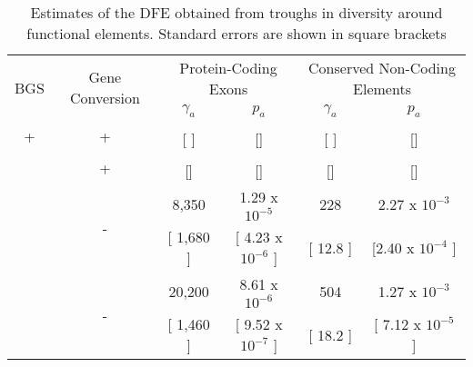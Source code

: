 

\begin{table}[h]
\caption{Estimates of the DFE obtained from troughs in diversity around functional elements. Standard errors are shown in square brackets}
\centering
	\label{EstimatesCastaneus}
        \begin{tabular}{cccccc}

        \hline
             \multirow{2}{*}{BGS}& \multirow{2}{*}{Gene Conversion} & \multicolumn{2}{c}{Protein-Coding Exons} & \multicolumn{2}{c}{Conserved Non-Coding Elements}  \\
 & & $\gamma_a$ & $p_a$ &$\gamma_a$ & $p_a$  \\ [0.5ex] \hline
 
 \multirow{2}{*}{+} & \multirow{2}{*}{+} & & & &  \\
   &  &  [ ]& []& [  ] & []\\ \hdashline
 
 \multirow{2}{*}{-} & \multirow{2}{*}{+} &   &  & & \\
   &  &  []& []& [] & []\\ \hdashline

 \multirow{2}{*}{+} & \multirow{2}{*}{-} &  8,350 & 1.29 x $10^{-5}$ & 228 & 2.27 x $10^{-3}$ \\
   &  &  [ 1,680 ]& [ 4.23 x $10^{-6}$ ]& [ 12.8 ] & [2.40 x $10^{-4}$ ]\\ \hdashline
   
 \multirow{2}{*}{-} & \multirow{2}{*}{-} &  20,200 & 8.61 x $10^{-6}$ & 504 & 1.27 x $10^{-3}$ \\
  &  & [ 1,460 ] & [ 9.52 x $10^{-7}$ ]& [ 18.2 ] & [ 7.12 x $10^{-5}$ ]\\ \hline

        \end{tabular}
    \label{tab:Table1}
    
\end{table}
